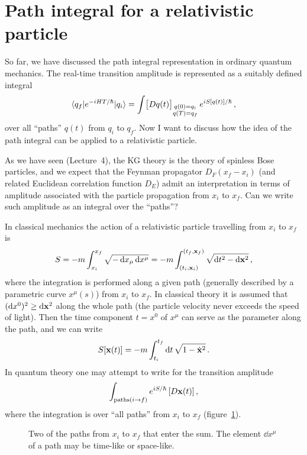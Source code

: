 \section{Path integral for a relativistic particle}

So far, we have discussed the path integral representation in ordinary quantum
mechanics. The real-time transition amplitude is represented as a suitably
defined integral
\[
\langle q_f|e^{-iHT/\hbar}|q_i\rangle=\int\bigl[Dq(t)\bigr]_{\substack{q(0)=q_i\\q(T)=q_f}}\,e^{iS[q(t)]/\hbar}\,,
\]
over all ``paths'' $q(t)$ from $q_i$ to $q_f$. Now I want to discuss how the
idea of the path integral can be applied to a relativistic particle.

As we have seen (Lecture~4), the KG theory is the theory of spinless Bose
particles, and we expect that the Feynman propagator $D_F(x_f-x_i)$ (and
related Euclidean correlation function $D_E$) admit an interpretation in terms
of amplitude associated with the particle propagation from $x_i$ to $x_f$. Can
we write such amplitude as an integral over the ``paths''?

In classical mechanics the action of a relativistic particle travelling from
$x_i$ to $x_f$ is
\[
S=-m\int_{x_i}^{x_f}\sqrt{-\mathop{}\!\mathrm{d} x_\mu\mathop{}\!\mathrm{d} x^\mu}=-m\int_{(t_i,\mathbf{x}_i)}^{(t_f,\mathbf{x}_f)}\sqrt{\mathop{}\!\mathrm{d} t^2-\mathop{}\!\mathrm{d}\mathbf{x}^2}\,,
\]
where the integration is performed along a given path (generally described by
a parametric curve $x^\mu(s)$) from $x_i$ to $x_f$. In classical theory it is
assumed that $(\mathop{}\!\mathrm{d} x^0)^2\ge \mathop{}\!\mathrm{d}\mathbf{x}^2$ along the whole path (the particle velocity
never exceeds the speed of light). Then the time component $t=x^0$ of $x^\mu$
can serve as the parameter along the path, and we can write
\[
S[\mathbf{x}(t)]=-m\int_{t_i}^{t_f}\mathop{}\!\mathrm{d} t\,\sqrt{1-\dot{\mathbf{x}}^2}\,.
\]
In quantum theory one may attempt to write for the transition amplitude
\[
\int_{\text{paths}(i\to f)}e^{iS/\hbar}\,[D\mathbf{x}(t)]\,,
\]
where the integration is over ``all paths'' from $x_i$ to $x_f$
(figure~\ref{fig:relpath}).
\begin{figure}[ht]
\centering{}
\caption{Two of the paths from $x_i$ to $x_f$ that enter the sum. The
element $\dd x^\mu$ of a path may be time-like or space-like.}
\label{fig:relpath}
\end{figure}

